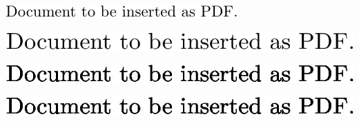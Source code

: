 \documentclass{scrartcl}
\begin{document}
      \includegraphics{img}

      \includegraphics{img2}

      \includegraphics{img3}

      \includegraphics{img4}
    
\end{document}
